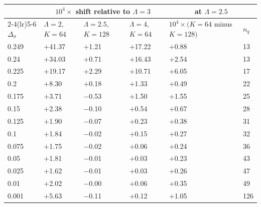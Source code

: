 \begin{tabular}{llllll}
\toprule
 & \multicolumn{3}{c}{$10^4\times$ shift relative to $\Lambda=3$} & \multicolumn{2}{c}{at $\Lambda=2.5$}\\
\cmidrule(lr){2-4}\cmidrule(lr){5-6}
$\Delta_\sigma$ & $\Lambda{=}2$, $K{=}64$ & $\Lambda{=}2.5$, $K{=}128$ & $\Lambda{=}4$, $K{=}64$ & $10^4\times(K{=}64$ minus $K{=}128)$ & $n_q$\\
\midrule
0.249 & $+$41.37 & $+$1.21 & $+$17.22 & $+$0.88 & 13\\
0.24 & $+$34.03 & $+$0.71 & $+$16.43 & $+$2.54 & 13\\
0.225 & $+$19.17 & $+$2.29 & $+$10.71 & $+$6.05 & 17\\
0.2 & $+$8.30 & $+$0.18 & $+$1.33 & $+$0.49 & 22\\
0.175 & $+$3.71 & $-$0.53 & $+$1.50 & $+$1.55 & 25\\
0.15 & $+$2.38 & $-$0.10 & $+$0.54 & $+$0.67 & 28\\
0.125 & $+$1.90 & $-$0.07 & $+$0.23 & $+$0.38 & 31\\
0.1 & $+$1.84 & $-$0.02 & $+$0.15 & $+$0.27 & 32\\
0.075 & $+$1.75 & $-$0.02 & $+$0.06 & $+$0.24 & 36\\
0.05 & $+$1.81 & $-$0.01 & $+$0.03 & $+$0.23 & 43\\
0.025 & $+$1.62 & $-$0.01 & $+$0.03 & $+$0.26 & 47\\
0.01 & $+$2.02 & $-$0.00 & $+$0.06 & $+$0.35 & 49\\
0.001 & $+$5.63 & $-$0.11 & $+$0.12 & $+$1.05 & 126\\
\bottomrule
\end{tabular}
